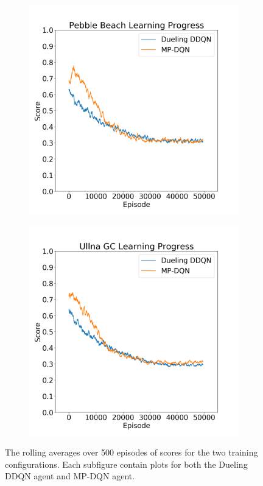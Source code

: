 \documentclass{kththesis}
\begin{document}
\begin{figure}
    \centering
    \begin{subfigure}{0.45\textwidth}
    \centering
    \includegraphics[width=\textwidth]{TrainingPlots/Pebble9_training.png}
    \end{subfigure}
    \begin{subfigure}{0.45\textwidth}
    \centering
    \includegraphics[width=\textwidth]{TrainingPlots/Ullna9_training.png}
    \end{subfigure}
    \caption{The rolling averages over 500 episodes of scores for the two training configurations. Each subfigure contain plots for both the Dueling DDQN agent and MP-DQN agent.}
    \label{fig:training_plots}
\end{figure}
\end{document}
